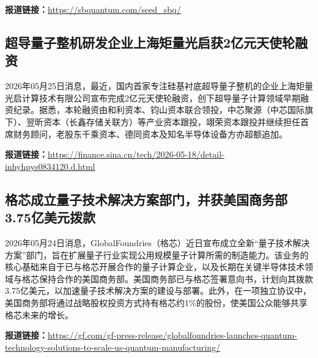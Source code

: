 \documentclass[12pt,a4paper]{ctexart}
\begin{document}
\noindent\textbf{报道链接：}\url{https://sbquantum.com/seed\_sbq/}

\subsection{ 超导量子整机研发企业上海矩量光启获2亿元天使轮融资 }

2026年05月25日消息，最近，国内首家专注硅基衬底超导量子整机的企业上海矩量光启计算技术有限公司宣布完成2亿元天使轮融资，创下超导量子计算领域早期融资纪录。据悉，本轮融资由和利资本、钧山资本联合领投，中芯聚源（中芯国际旗下）、翌昕资本（长鑫存储关联方）等产业资本跟投，翊荣资本跟投并继续担任首席财务顾问，老股东千乘资本、德同资本及知名半导体设备方亦超额追加。

\noindent\textbf{报道链接：}\url{https://finance.sina.cn/tech/2026-05-18/detail-inhyhpys0834120.d.html}

\subsection{ 格芯成立量子技术解决方案部门，并获美国商务部3.75亿美元拨款 }

2026年05月24日消息，GlobalFoundries（格芯）近日宣布成立全新“量子技术解决方案”部门，旨在扩展量子行业实现公用规模量子计算所需的制造能力。该业务的核心基础来自于已与格芯开展合作的量子计算企业，以及长期在关键半导体技术领域与格芯保持合作的美国商务部。美国商务部已与格芯签署意向书，计划向其拨款3.75亿美元，以加速量子技术解决方案的建设与部署。此外，在一项独立协议中，美国商务部将通过战略股权投资方式持有格芯约1\%的股份，使美国公众能够共享格芯未来的增长。

\noindent\textbf{报道链接：}\url{https://gf.com/gf-press-release/globalfoundries-launches-quantum-technology-solutions-to-scale-us-quantum-manufacturing/}
\end{document}
